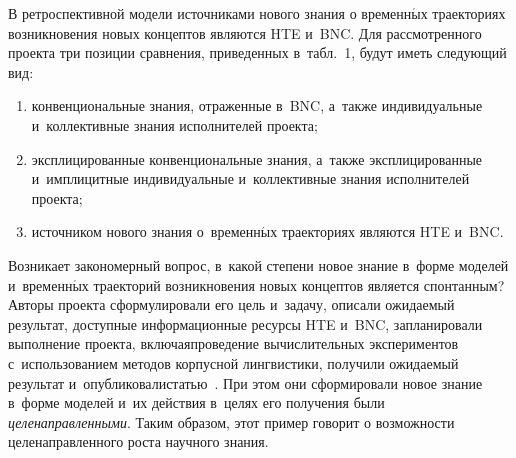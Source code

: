 \begin{multicols}{2}
  
  В ретроспективной модели источниками нового знания о временн$\acute{\mbox{ы}}$х 
траекториях возникновения новых концептов являются HTE и~BNC. Для 
рассмотренного проекта три позиции сравнения, приведенных в~табл.~1, будут 
иметь следующий вид:
  \begin{enumerate}[(1)]
  \item конвенциональные знания, отраженные в~BNC, а~также 
индивидуальные и~коллективные знания исполнителей проекта;
  \item  эксплицированные конвенциональные знания, а~также 
эксплицированные и~имплицитные индивидуальные и~коллективные знания 
исполнителей проекта;
  \item  источником нового знания о~временн$\acute{\mbox{ы}}$х траекториях являются HTE 
и~BNC.
  \end{enumerate}
  
  Возникает закономерный вопрос, в~какой степени новое знание в~форме 
моделей и~временн$\acute{\mbox{ы}}$х траекторий возникновения новых концептов является 
спонтанным? Авторы проекта сформулировали его цель и~задачу, описали 
ожидаемый результат, доступные информационные ресурсы HTE и~BNC,
запланировали выполнение проекта, включая\linebreak проведение вычислительных 
экспериментов с~использованием методов корпусной лингвистики, получили 
ожидаемый результат и~опубликовали\linebreak  статью~\cite{9-zat}. При этом они 
сформировали новое знание в~форме моделей и~их действия в~целях его 
получения были \textit{целенаправленными}. Таким образом, этот пример 
говорит о возможности целенаправленного роста научного знания.

  \begin{table*}\small %
  \begin{center}
  \vspace*{2ex}
  

\end{center}
\end{table*}
\end{multicols}
